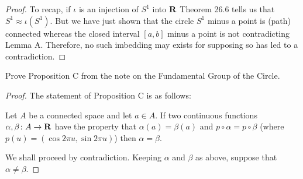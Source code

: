 \begin{proof}
To recap, if $\iota$ is an injection of $S^1$ into $\mathbf{R}$ Theorem 26.6 tells
us that $S^1\approx\iota(S^1)$. But we have just shown that the circle
$S^1$ minus a point is (path) connected whereas the closed interval $[a,b]$
minus a point is not contradicting Lemma A. Therefore, no such imbedding
may exists for supposing so has led to a contradiction.
\end{proof}
\newpage
\begin{problem}[(D)]
Prove Proposition C from the note on the Fundamental Group of the Circle.
\end{problem}
\begin{proof}
The statement of Proposition C is as follows:
\begin{proposition*}[\textbf{C}]
Let $A$ be a connected space and let $a\in A$. If two continuous functions
$\alpha,\beta\colon A\to\mathbf{R}$ have the property that $\alpha(a)=\beta(a)$
and $p\circ\alpha=p\circ\beta$ (where $p(u)=(\cos 2\pi u,\sin 2\pi u)$)
then $\alpha=\beta$.
\end{proposition*}
We shall proceed by contradiction. Keeping $\alpha$ and $\beta$ as above,
suppose that $\alpha\neq\beta$.
\end{proof}

